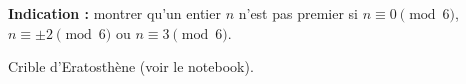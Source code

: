 \begin{exstheorie}
\textbf{Indication :} montrer qu'un entier $n$ n'est pas premier si $n \equiv 0 \pmod 6$, $n \equiv \pm 2 \pmod 6$ ou $n \equiv 3 \pmod 6$.%

\eexo
\pagebreak[3]

\exordi Crible d'Eratosthène  (voir le notebook).

%
%
%
%

\end{exstheorie}


















